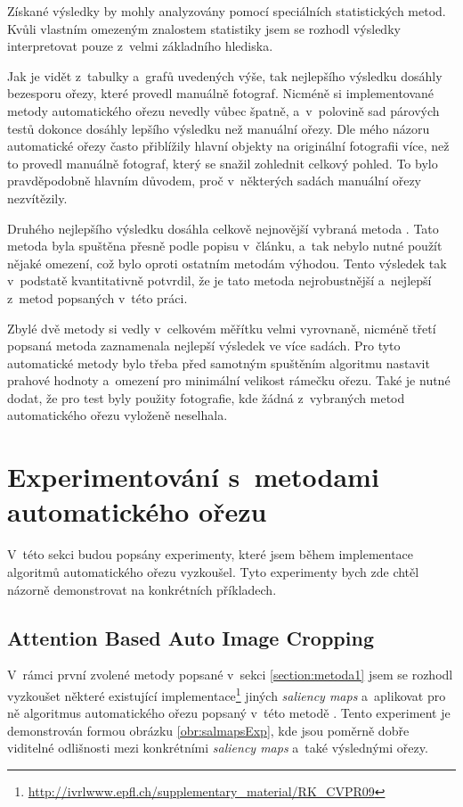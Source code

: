 Získané výsledky by mohly analyzovány pomocí speciálních statistických metod. Kvůli vlastním omezeným znalostem statistiky jsem se rozhodl výsledky interpretovat pouze z~velmi základního hlediska.

Jak je vidět z~tabulky a~grafů uvedených výše, tak nejlepšího výsledku dosáhly bezesporu ořezy, které provedl manuálně fotograf. Nicméně si implementované metody automatického ořezu nevedly vůbec špatně, a~v~polovině sad párových testů dokonce dosáhly lepšího výsledku než manuální ořezy. Dle mého názoru automatické ořezy často přiblížily hlavní objekty na originální fotografii více, než to provedl manuálně fotograf, který se snažil zohlednit celkový pohled. To bylo pravděpodobně hlavním důvodem, proč v~některých sadách manuální ořezy nezvítězily.

Druhého nejlepšího výsledku dosáhla celkově nejnovější vybraná metoda \cite{Fang2014}. Tato metoda byla spuštěna přesně podle popisu v~článku, a~tak nebylo nutné použít nějaké omezení, což bylo oproti ostatním metodám výhodou. Tento výsledek tak v~podstatě kvantitativně potvrdil, že je tato metoda nejrobustnější a~nejlepší z~metod popsaných v~této práci.

Zbylé dvě metody \cite{Stentiford2007,Suh2003} si vedly v~celkovém měřítku velmi vyrovnaně, nicméně třetí popsaná metoda \cite{Suh2003} zaznamenala nejlepší výsledek ve více sadách. Pro tyto automatické metody bylo třeba před samotným spuštěním algoritmu nastavit prahové hodnoty a~omezení pro minimální velikost rámečku ořezu. Také je nutné dodat, že pro test byly použity fotografie, kde žádná z~vybraných metod automatického ořezu vyloženě neselhala.

\section{Experimentování s~metodami automatického ořezu} \label{sekce:expmetody}
V~této sekci budou popsány experimenty, které jsem během implementace algoritmů automatického ořezu vyzkoušel. Tyto experimenty bych zde chtěl názorně demonstrovat na konkrétních příkladech.

\subsection{Attention Based Auto Image Cropping}
V~rámci první zvolené metody popsané v~sekci \ref{section:metoda1} jsem se rozhodl vyzkoušet některé existující implementace\footnote{\url{http://ivrlwww.epfl.ch/supplementary_material/RK_CVPR09}} jiných \emph{saliency maps} \cite{Achanta2009,Itti1998} a~aplikovat pro ně algoritmus automatického ořezu popsaný v~této metodě \cite{Stentiford2007}. Tento experiment je demonstrován formou obrázku \ref{obr:salmapsExp}, kde jsou poměrně dobře viditelné odlišnosti mezi konkrétními \emph{saliency maps} a~také výslednými ořezy.

